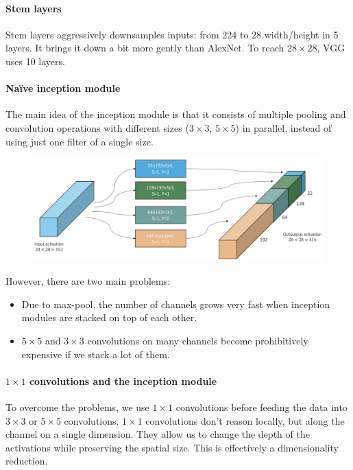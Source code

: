 \documentclass{article}
\begin{document}
\paragraph{Stem layers}
Stem layers aggressively downsamples inputs: from 224 to 28 width/height in 5 layers.
It brings it down a bit more gently than AlexNet.
To reach $28\times 28$, VGG uses 10 layers.

\paragraph{Naïve inception module}
The main idea of the inception module is that it consists of multiple pooling and convolution operations with different sizes ($3\times 3$, $5\times 5$) in parallel, instead of using just one filter of a single size.
\begin{figure}[htbp]
  \centering
  \includegraphics[width=0.8\linewidth]{./img/inception_naive.jpg}
\end{figure}
However, there are two main problems:
\begin{itemize}
  \item Due to max-pool, the number of channels grows very fast when inception modules are stacked on top of each other.
  \item $5 \times 5$ and $3 \times 3$ convolutions on many channels become prohibitively expensive if we stack a lot of them.
\end{itemize}

\paragraph{$1 \times 1$ convolutions and the inception module}
To overcome the problems, we use $1 \times 1$ convolutions before feeding the data into $3\times 3$ or $5 \times 5$ convolutions.
$1\times 1$ convolutions don't reason locally, but along the channel on a single dimension.
They allow us to change the depth of the activations while preserving the spatial size.
This is effectively a dimensionality reduction.
\end{document}
